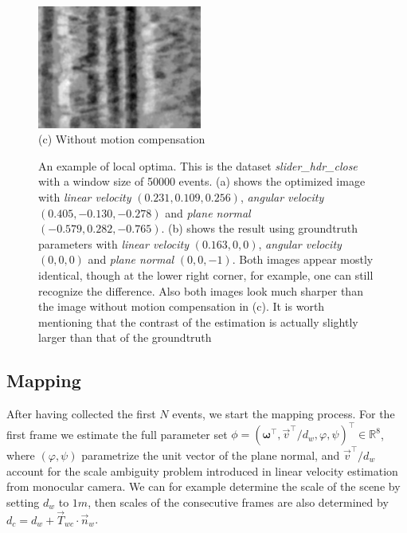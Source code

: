 \begin{figure}
  \begin{minipage}[t]{\textwidth}
    \centering \includegraphics[width =
    0.48\textwidth]{images/slider_zero_motion.jpg}
    \label{subfig:estimation}
    \\(c) Without motion compensation
  \end{minipage}
  \hfill

  \caption{An example of local optima. This is the dataset
    \textit{slider\_hdr\_close} with a window size of 50000
    events. (a) shows the optimized image with \textit{linear
      velocity} $( 0.231, 0.109, 0.256)$, \textit{angular velocity}
    $(0.405, -0.130, -0.278)$ and \textit{plane normal}
    $(-0.579, 0.282, -0.765)$. (b) shows the result using groundtruth
    parameters with \textit{linear velocity} $(0.163, 0, 0)$,
    \textit{angular velocity} $(0, 0, 0)$ and \textit{plane normal}
    $(0, 0, -1)$. Both images appear mostly identical, though at the
    lower right corner, for example, one can still recognize the
    difference. Also both images look much sharper than the image
    without motion compensation in (c). It is worth mentioning that
    the contrast of the estimation is actually slightly larger than
    that of the groundtruth}
  \label{fig:local_optimum}
\end{figure}

\subsection{Mapping}
\label{sec:keyframe2map}

After having collected the first $N$ events, we start the mapping
process. For the first frame we estimate the full parameter set
$\phi=\left(\bm{\omega}^\top,\vec{v}^\top/d_w,\varphi,\psi\right)^\top\in\mathbb{R}^8$,
where $\left(\varphi, \psi\right)$ parametrize the unit vector of the
plane normal, and $\vec{v}^\top/d_w$ account for the scale ambiguity
problem introduced in linear velocity estimation from monocular
camera. We can for example determine the scale of the scene by setting
$d_w$ to $1m$, then scales of the consecutive frames are also
determined by $d_c = d_w+\vec{T}_{wc}\cdot\vec{n}_w$.

